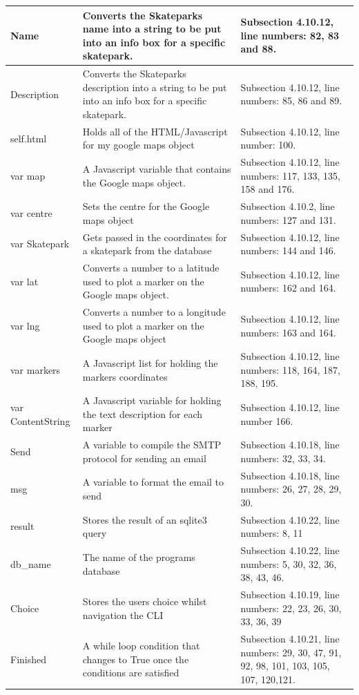 \begin{center}
\begin{longtable}{|p{5cm}|p{6cm}|p{3.5cm}|}
Name & Converts the Skateparks name into a string to be put into an info box for a specific skatepark. & Subsection 4.10.12, line numbers: 82, 83 and 88. \\ \hline
Description & Converts the Skateparks description into a string to be put into an info box for a specific skatepark. & Subsection 4.10.12, line numbers: 85, 86 and 89. \\ \hline

self.html & Holds all of the HTML/Javascript for my google maps object & Subsection 4.10.12, line number: 100. \\ \hline

var map & A Javascript variable that contains the Google maps object. & Subsection 4.10.12, line numbers: 117, 133, 135, 158 and 176. \\ \hline
var centre & Sets the centre for the Google maps object & Subsection 4.10.2, line numbers: 127 and 131. \\ \hline
var Skatepark & Gets passed in the coordinates for a skatepark from the database & Subsection 4.10.12, line numbers: 144 and 146. \\ \hline
var lat & Converts a number to a latitude used to plot a marker on the Google maps object. & Subsection 4.10.12, line numbers: 162 and 164. \\ \hline
var lng & Converts a number to a longitude used to plot a marker on the Google maps object & Subsection 4.10.12, line numbers: 163 and 164. \\ \hline
var markers & A Javascript list for holding the markers coordinates & Subsection 4.10.12, line numbers: 118, 164, 187, 188, 195. \\ \hline
var ContentString & A Javascript variable for holding the text description for each marker & Subsection 4.10.12, line number 166. \\ \hline
Send & A variable to compile the SMTP protocol for sending an email & Subsection 4.10.18, line numbers: 32, 33, 34.  \\ \hline
msg & A variable to format the email to send & Subsection 4.10.18, line numbers: 26, 27, 28, 29, 30. \\ \hline
result & Stores the result of an sqlite3 query & Subsection 4.10.22, line numbers: 8, 11 \\ \hline
db\_name & The name of the programs database & Subsection 4.10.22, line numbers: 5, 30, 32, 36, 38, 43, 46.\\ \hline 
Choice & Stores the users choice whilst navigation the CLI & Subsection 4.10.19, line numbers: 22, 23, 26, 30, 33, 36, 39\\ \hline 
Finished & A while loop condition that changes to True once the conditions are satisfied & Subsection 4.10.21, line numbers: 29, 30, 47, 91, 92, 98, 101, 103, 105, 107, 120,121. \\ \hline



\end{longtable}
\label{tab:Variable List}
\end{center}






